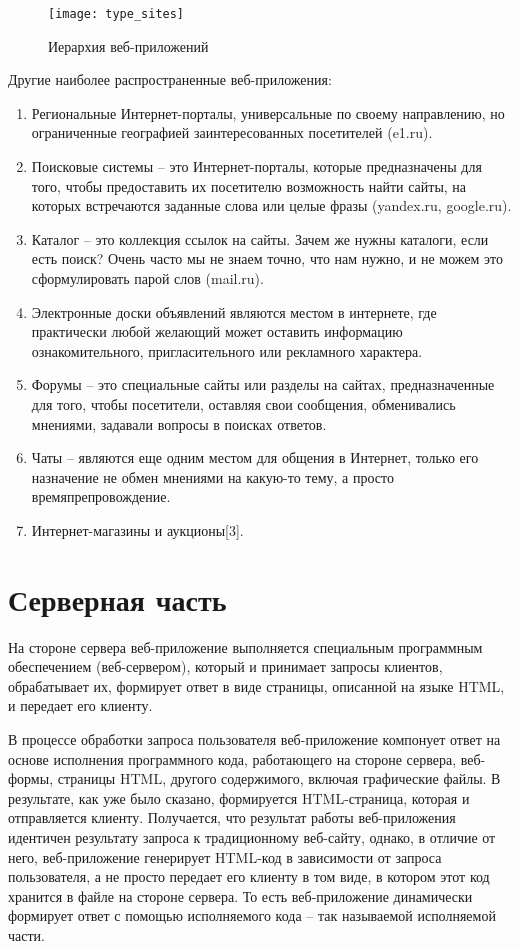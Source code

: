 \begin{figure}[ht]
\center\texttt{[image: type\_sites]}
\caption{Иерархия веб-приложений}\label{type_sites}
\end{figure}

Другие наиболее распространенные веб-приложения:
\begin{enumerate}
\item Региональные Интернет-порталы, универсальные по своему направлению, но ограниченные географией заинтересованных посетителей (e1.ru).
\item Поисковые системы -- это Интернет-порталы, которые предназначены для того, чтобы предоставить их посетителю возможность найти сайты, на которых встречаются заданные слова или целые фразы (yandex.ru, google.ru).
\item Каталог -- это коллекция ссылок на сайты. Зачем же нужны каталоги, если есть поиск? Очень часто мы не знаем точно, что нам нужно, и не можем это сформулировать парой слов (mail.ru).
\item Электронные доски объявлений  являются местом в интернете, где практически любой желающий может оставить информацию ознакомительного, пригласительного или рекламного характера.
\item Форумы -- это специальные сайты или разделы на сайтах, предназначенные для того, чтобы посетители, оставляя свои сообщения, обменивались мнениями, задавали вопросы в поисках ответов.
\item Чаты -- являются еще одним местом для общения в Интернет, только его назначение не обмен мнениями на какую-то тему, а просто времяпрепровождение.
\item Интернет-магазины и аукционы[3].
\end{enumerate}


\section {Серверная часть}

На стороне сервера веб-приложение выполняется специальным программным обеспечением (веб-сервером), который и принимает запросы клиентов, обрабатывает их, формирует ответ в виде страницы, описанной на языке HTML, и передает его клиенту.

В процессе обработки запроса пользователя веб-приложение компонует ответ на основе исполнения программного кода, работающего на стороне сервера, веб-формы, страницы HTML, другого содержимого, включая графические файлы. В результате, как уже было сказано, формируется HTML-страница, которая и отправляется клиенту. Получается, что результат работы веб-приложения идентичен результату запроса к традиционному веб-сайту, однако, в отличие от него, веб-приложение генерирует HTML-код в зависимости от запроса пользователя, а не просто передает его клиенту в том виде, в котором этот код хранится в файле на стороне сервера. То есть веб-приложение динамически формирует ответ с помощью исполняемого кода -- так называемой исполняемой части.

